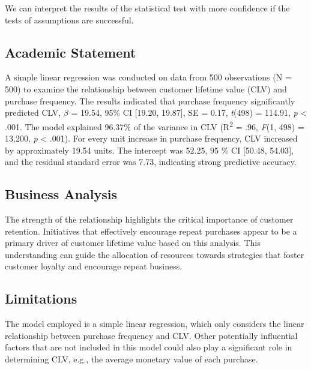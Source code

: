 \documentclass[
]{article}
\begin{document}
We can interpret the results of the statistical test with more
confidence if the tests of assumptions are successful.

\subsection{Academic Statement}\label{academic-statement}

A simple linear regression was conducted on data from 500 observations
(N = 500) to examine the relationship between customer lifetime value
(CLV) and purchase frequency. The results indicated that purchase
frequency significantly predicted CLV, \(\beta\) = 19.54, 95\% CI
{[}19.20, 19.87{]}, SE = 0.17, \emph{t}(498) = 114.91, \emph{p}
\textless{} .001. The model explained 96.37\% of the variance in CLV
(R\textsuperscript{2} = .96, \emph{F}(1, 498) = 13,200, \emph{p}
\textless{} .001). For every unit increase in purchase frequency, CLV
increased by approximately 19.54 units. The intercept was 52.25, 95 \%
CI {[}50.48, 54.03{]}, and the residual standard error was 7.73,
indicating strong predictive accuracy.

\subsection{Business Analysis}\label{business-analysis}

The strength of the relationship highlights the critical importance of
customer retention. Initiatives that effectively encourage repeat
purchases appear to be a primary driver of customer lifetime value based
on this analysis. This understanding can guide the allocation of
resources towards strategies that foster customer loyalty and encourage
repeat business.

\subsection{Limitations}\label{limitations}

The model employed is a simple linear regression, which only considers
the linear relationship between purchase frequency and CLV. Other
potentially influential factors that are not included in this model
could also play a significant role in determining CLV, e.g., the average
monetary value of each purchase.
\end{document}
